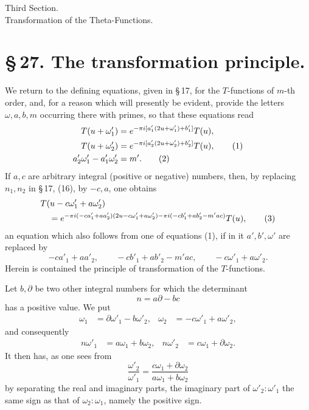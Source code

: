\documentclass[11pt]{article}
\begin{document}
\begin{center}
{\large Third Section.}\\[0.7em]
{\Large Transformation of the Theta-Functions.}
\end{center}

\section*{\S\,27. The transformation principle.}

We return to the defining equations, given in \S\,17, for the $T$-functions of $m$-th order, and, for a reason which will presently be evident, provide the letters $\omega,a,b,m$ occurring there with primes, so that these equations read
\begin{align}
T(u+\omega'_1)&=e^{-\pi i[a'_1(2u+\omega'_1)+b'_1]}T(u),\notag\\
T(u+\omega'_2)&=e^{-\pi i[a'_2(2u+\omega'_2)+b'_2]}T(u), \tag{1}\\
a'_2\omega'_1-a'_1\omega'_2&=m'. \tag{2}
\end{align}
If $a,c$ are arbitrary integral (positive or negative) numbers, then, by replacing $n_1,n_2$ in \S\,17, (16), by $-c,a$, one obtains
\begin{align}
&T(u-c\omega'_1+a\omega'_2) \notag\\
&\quad =e^{-\pi i(-ca'_1+aa'_2)(2u-c\omega'_1+a\omega'_2)-\pi i(-cb'_1+ab'_2-m'ac)}T(u), \tag{3}
\end{align}
an equation which also follows from one of equations (1), if in it $a',b',\omega'$ are replaced by
\[
-ca'_1+aa'_2,
\qquad -cb'_1+ab'_2-m'ac,
\qquad -c\omega'_1+a\omega'_2.
\]
Herein is contained the principle of transformation of the $T$-functions.

Let $b,\partial$ be two other integral numbers for which the determinant
\begin{equation}
n=a\partial-bc \tag{4}
\end{equation}
has a positive value. We put
\begin{align}
\omega_1&=\partial\omega'_1-b\omega'_2,&
\omega_2&=-c\omega'_1+a\omega'_2, \tag{5}
\end{align}
and consequently
\begin{align}
n\omega'_1&=a\omega_1+b\omega_2,&
n\omega'_2&=c\omega_1+\partial\omega_2. \tag{6}
\end{align}
It then has, as one sees from
\[
\frac{\omega'_2}{\omega'_1}=\frac{c\omega_1+\partial\omega_2}{a\omega_1+b\omega_2}
\]
by separating the real and imaginary parts, the imaginary part of $\omega'_2:\omega'_1$ the same sign as that of $\omega_2:\omega_1$, namely the positive sign.
\end{document}
